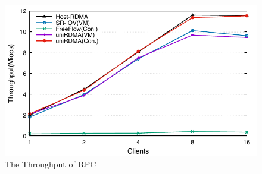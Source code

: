 \begin{figure}[!ht]
	\centering
	\includegraphics[width=1.0\linewidth]{images/rpc.pdf}
	\caption{The Throughput of RPC}
	\label{fig:rpc}
\end{figure}


